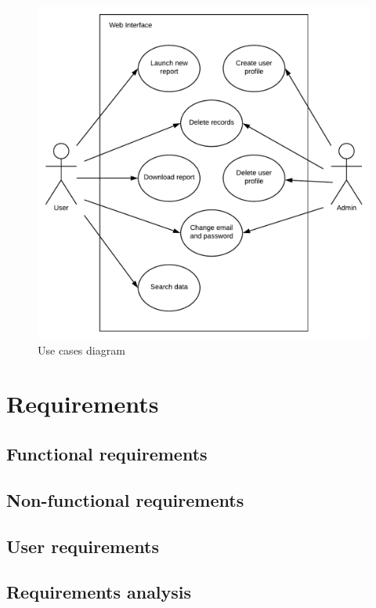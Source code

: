 \begin{figure}[H]
\centering
\includegraphics[scale=0.4]{imgs/UseCasesDiag.pdf}
\caption{Use cases diagram}
\label{fig:sysarch}
\end{figure}

\section{Requirements}

\subsection{Functional requirements}

\subsection{Non-functional requirements}

\subsection{User requirements}

\subsection{Requirements analysis}

